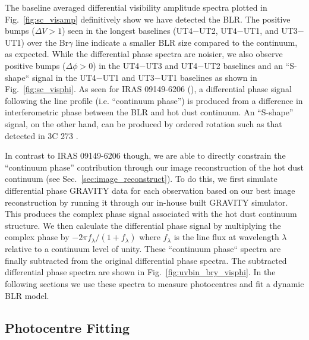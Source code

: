 \documentclass[longauth,]{aa}
\newcommand{\brg}{Br$\gamma$}
\begin{document}
The baseline averaged differential visibility amplitude spectra plotted in Fig.~\ref{fig:sc_visamp} definitively show we have detected the BLR. The positive bumps ($\Delta V > 1$) seen in the longest baselines (UT4$-$UT2, UT4$-$UT1, and 
UT3$-$UT1) over the \brg{} line indicate a smaller BLR size compared to the continuum, as expected. While the differential phase spectra are noisier, we also observe positive bumps ($\Delta \phi > 0$) in the UT4$-$UT3 and UT4$-$UT2 baselines and an ``S-shape`` signal in the UT4$-$UT1 and UT3$-$UT1 baselines as shown in Fig.~\ref{fig:sc_visphi}. As seen for IRAS 09149-6206 (), a differential phase signal following the line profile (i.e. 
``continuum phase'') is produced from a difference in interferometric phase between the BLR and hot dust continuum. An ``S-shape'' signal, on the other hand, can be produced by ordered rotation such as that detected in 3C 273 \citep{GC2018Natur}. 

In contrast to IRAS 09149-6206 though, we are able to directly constrain the ``continuum phase'' contribution through our image reconstruction of the hot dust continuum (see Sec.~\ref{sec:image_reconstruct}). To do this, we first simulate differential phase GRAVITY data for each observation based on our best image reconstruction by running it through our in-house built GRAVITY simulator. This produces the complex phase signal associated with the hot dust continuum structure. We then calculate the differential phase signal by multiplying the complex phase by $-2\pi f_\lambda/(1 + f_\lambda)$ where $f_\lambda$ is the line flux at wavelength $\lambda$ relative to a continuum level of unity. These ``continuum phase`` spectra are finally subtracted from the original differential phase spectra. The subtracted differential phase spectra are shown in Fig.~\ref{fig:uvbin_bry_visphi}. In the following sections we use these spectra to measure photocentres and fit a dynamic BLR model.

\subsection{Photocentre Fitting}
\end{document}
